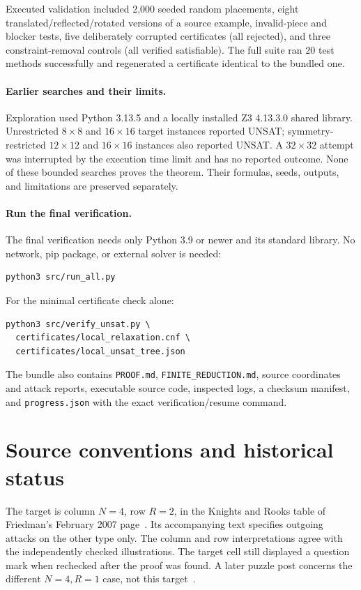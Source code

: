 \documentclass[11pt]{article}
\begin{document}
Executed validation included 2,000 seeded random placements, eight
translated/reflected/rotated versions of a source example, invalid-piece
and blocker tests, five deliberately corrupted certificates (all rejected),
and three constraint-removal controls (all verified satisfiable). The
full suite ran 20 test methods successfully and regenerated a certificate
identical to the bundled one.

\paragraph{Earlier searches and their limits.}
Exploration used Python 3.13.5 and a locally installed Z3 4.13.3.0 shared
library. Unrestricted \(8\times8\) and \(16\times16\) target instances
reported UNSAT; symmetry-restricted \(12\times12\) and \(16\times16\)
instances also reported UNSAT. A \(32\times32\) attempt was interrupted
by the execution time limit and has no reported outcome. None of these
bounded searches proves the theorem. Their formulas, seeds, outputs, and
limitations are preserved separately.

\paragraph{Run the final verification.}
The final verification needs only Python 3.9 or newer and its standard
library. No network, pip package, or external solver is needed:
\begin{verbatim}
python3 src/run_all.py
\end{verbatim}
For the minimal certificate check alone:
\begin{verbatim}
python3 src/verify_unsat.py \
  certificates/local_relaxation.cnf \
  certificates/local_unsat_tree.json
\end{verbatim}
The bundle also contains \texttt{PROOF.md}, \texttt{FINITE\_REDUCTION.md},
source coordinates and attack reports, executable source code, inspected
logs, a checksum manifest, and \texttt{progress.json} with the exact
verification/resume command.

\section{Source conventions and historical status}
The target is column \(N=4\), row \(R=2\), in the Knights and Rooks table
of Friedman's February 2007 page~\cite{friedman}. Its accompanying text
specifies outgoing attacks on the other type only. The column and row
interpretations agree with the independently checked illustrations.
The target cell still displayed a question mark when rechecked after the
proof was found. A later puzzle post concerns the different \(N=4,R=1\)
case, not this target~\cite{puzzling}.
\end{document}
